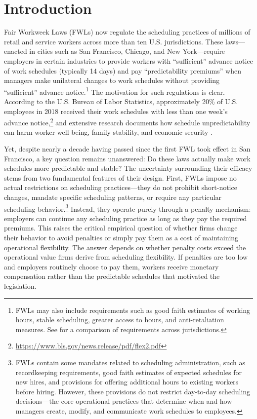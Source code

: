 \documentclass[letterpaper,11pt,leqno]{article}
\theoremstyle{paper}
\begin{document}
\section{Introduction} \label{sec:intro}
Fair Workweek Laws (FWLs) now regulate the scheduling practices of millions of retail and service workers across more than ten U.S. jurisdictions. These laws—enacted in cities such as San Francisco, Chicago, and New York—require employers in certain industries to provide workers with ``sufficient'' advance notice of work schedules (typically 14 days) and pay ``predictability premiums'' when managers make unilateral changes to work schedules without providing ``sufficient'' advance notice.\footnote{FWLs may also include requirements such as good faith estimates of working hours, stable scheduling, greater access to hours, and anti-retaliation measures. See \cite{fw_info} for a comparison of requirements across jurisdictions.} The motivation for such regulations is clear. According to the U.S. Bureau of Labor Statistics, approximately 20\% of U.S. employees in 2018 received their work schedules with less than one week's advance notice,\footnote{\url{https://www.bls.gov/news.release/pdf/flex2.pdf}} and extensive research documents how schedule unpredictability can harm worker well-being, family stability, and economic security \citep{henly_lambert_2014, clasp_2015, Lambert218, seattle_pp, ananant_emeryville}.

Yet, despite nearly a decade having passed since the first FWL took effect in San Francisco, a key question remains unanswered: Do these laws actually make work schedules more predictable and stable? The uncertainty surrounding their efficacy stems from two fundamental features of their design. First, FWLs impose no actual restrictions on scheduling practices—they do not prohibit short-notice changes, mandate specific scheduling patterns, or require any particular scheduling behavior.\footnote{FWLs contain some mandates related to scheduling administration, such as recordkeeping requirements, good faith estimates of expected schedules for new hires, and provisions for offering additional hours to existing workers before hiring. However, these provisions do not restrict day-to-day scheduling decisions—the core operational practices that determine when and how managers create, modify, and communicate work schedules to employees.} Instead, they operate purely through a penalty mechanism: employers can continue any scheduling practice as long as they pay the required premiums. This raises the critical empirical question of whether firms change their behavior to avoid penalties or simply pay them as a cost of maintaining operational flexibility. The answer depends on whether penalty costs exceed the operational value firms derive from scheduling flexibility. If penalties are too low and employers routinely choose to pay them, workers receive monetary compensation rather than the predictable schedules that motivated the legislation. 
\end{document}
